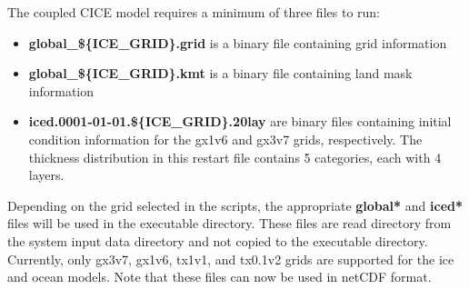 
The coupled CICE model requires a minimum of three files to run:

\begin{itemize}
  \item {\bf global\_\$\{ICE\_GRID\}.grid} is a binary file containing
        grid information
  \item {\bf global\_\$\{ICE\_GRID\}.kmt} is a binary file containing
        land mask information
  \item {\bf iced.0001-01-01.\$\{ICE\_GRID\}.20lay}
         are binary files containing initial condition information 
         for the gx1v6 and gx3v7 grids, respectively. The thickness 
         distribution in this restart file contains 5 categories, each 
         with 4 layers.
\end{itemize}

Depending on the grid selected in the scripts, the appropriate {\bf global*}
and {\bf iced*} files will be used in the executable directory. These files
are read directory from the system input data directory and not copied
to the executable directory.  Currently, only gx3v7, gx1v6, tx1v1, and tx0.1v2 
grids are supported for the ice and ocean models.  Note that these files can
now be used in netCDF format. \\

